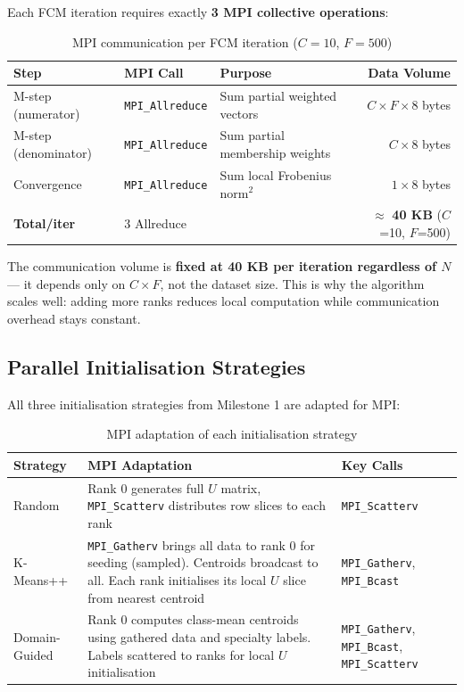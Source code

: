 \documentclass[12pt,a4paper]{article}
\begin{document}
Each FCM iteration requires exactly \textbf{3 MPI collective operations}:

\begin{table}[H]
\centering
\begin{tabularx}{\textwidth}{l l X r}
\toprule
\textbf{Step} & \textbf{MPI Call} & \textbf{Purpose} & \textbf{Data Volume} \\
\midrule
M-step (numerator) & \texttt{MPI\_Allreduce} & Sum partial weighted vectors & $C \times F \times 8$ bytes \\
M-step (denominator) & \texttt{MPI\_Allreduce} & Sum partial membership weights & $C \times 8$ bytes \\
Convergence & \texttt{MPI\_Allreduce} & Sum local Frobenius norm$^2$ & $1 \times 8$ bytes \\
\midrule
\textbf{Total/iter} & 3 Allreduce & & $\approx$ \textbf{40 KB} ($C$=10, $F$=500) \\
\bottomrule
\end{tabularx}
\caption{MPI communication per FCM iteration ($C=10$, $F=500$)}
\end{table}

The communication volume is \textbf{fixed at 40 KB per iteration regardless of $N$} — it depends only on $C \times F$, not the dataset size. This is why the algorithm scales well: adding more ranks reduces local computation while communication overhead stays constant.

\subsection{Parallel Initialisation Strategies}

All three initialisation strategies from Milestone 1 are adapted for MPI:

\begin{table}[H]
\centering
\begin{tabularx}{\textwidth}{l X X}
\toprule
\textbf{Strategy} & \textbf{MPI Adaptation} & \textbf{Key Calls} \\
\midrule
Random &
Rank 0 generates full $U$ matrix, \texttt{MPI\_Scatterv} distributes row slices to each rank &
\texttt{MPI\_Scatterv} \\
K-Means++ &
\texttt{MPI\_Gatherv} brings all data to rank 0 for seeding (sampled). Centroids broadcast to all. Each rank initialises its local $U$ slice from nearest centroid &
\texttt{MPI\_Gatherv}, \texttt{MPI\_Bcast} \\
Domain-Guided &
Rank 0 computes class-mean centroids using gathered data and specialty labels. Labels scattered to ranks for local $U$ initialisation &
\texttt{MPI\_Gatherv}, \texttt{MPI\_Bcast}, \texttt{MPI\_Scatterv} \\
\bottomrule
\end{tabularx}
\caption{MPI adaptation of each initialisation strategy}
\end{table}
\end{document}
